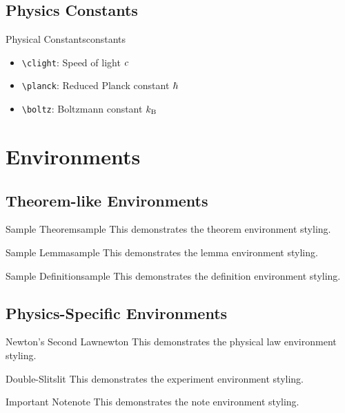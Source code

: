 \documentclass[a4paper]{book}
\begin{document}
\section{Physics Constants}
\begin{definition}{Physical Constants}{constants}
\begin{itemize}
\item \verb|\clight|: Speed of light \(c\)
\item \verb|\planck|: Reduced Planck constant \(\hbar\)
\item \verb|\boltz|: Boltzmann constant \(k_\text{B}\)
\end{itemize}
\end{definition}

\chapter{Environments}

\section{Theorem-like Environments}
\begin{theorem}{Sample Theorem}{sample}
This demonstrates the theorem environment styling.
\end{theorem}

\begin{lemma}{Sample Lemma}{sample}
This demonstrates the lemma environment styling.
\end{lemma}

\begin{definition}{Sample Definition}{sample}
This demonstrates the definition environment styling.
\end{definition}

\section{Physics-Specific Environments}
\begin{law}{Newton's Second Law}{newton}
This demonstrates the physical law environment styling.
\end{law}

\begin{experiment}{Double-Slit}{slit}
This demonstrates the experiment environment styling.
\end{experiment}

\begin{note}{Important Note}{note}
This demonstrates the note environment styling.
\end{note}
\end{document}
